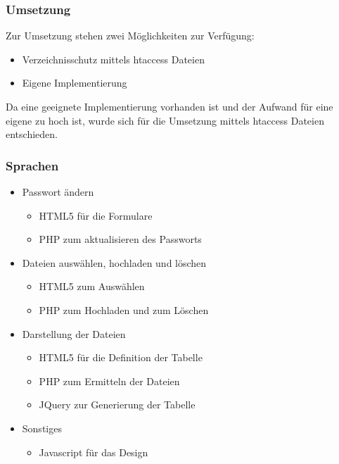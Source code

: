\begin{frame} %
  \frametitle{Umsetzung} %

  Zur Umsetzung stehen zwei Möglichkeiten zur Verfügung:
  \begin{itemize}
   \item Verzeichnisschutz mittels htaccess Dateien
   \item Eigene Implementierung
  \end{itemize}

  \bigskip

  Da eine geeignete Implementierung vorhanden ist und der Aufwand für eine eigene zu hoch ist, wurde sich für die Umsetzung mittels htaccess Dateien entschieden.
\end{frame}

\begin{frame} %
  \frametitle{Sprachen} %

   \begin{itemize}
    \item Passwort ändern
    \begin{itemize}
     \item HTML5 für die Formulare
     \item PHP zum aktualisieren des Passworts
    \end{itemize}

    \item Dateien auswählen, hochladen und löschen
    \begin{itemize}
     \item HTML5 zum Auswählen
     \item PHP zum Hochladen und zum Löschen
    \end{itemize}

    \item Darstellung der Dateien
    \begin{itemize}
     \item HTML5 für die Definition der Tabelle
     \item PHP zum Ermitteln der Dateien
     \item JQuery zur Generierung der Tabelle
    \end{itemize}

    \item Sonstiges
    \begin{itemize}
     \item Javascript für das Design
    \end{itemize}

   \end{itemize}

\end{frame}

